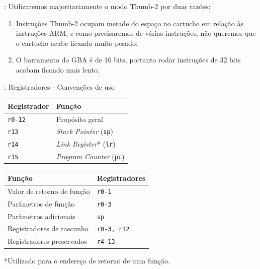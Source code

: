\documentclass{beamer}
\begin{document}
\begin{darkframes}
\begin{frame}{\secname: \subsecname}
    Utilizaremos majoritariamente o modo Thumb-2 por duas razões:
    \begin{enumerate}
        \item Instruções Thumb-2 ocupam metade do espaço no cartucho em
            relação às instruções ARM, e como precisaremos de várias
            instruções, não queremos que o cartucho acabe ficando muito
            pesado;
        \item O barramento do GBA é de 16 bits, portanto rodar instruções
            de 32 bits acabam ficando mais lento.
    \end{enumerate}
\end{frame}

\begin{frame}{\secname: Registradores - Convenções de uso}
    \begin{center}
        \begin{tabular}{|l|l|}
            \hline
            Registrador & Função \\\hline
            \texttt{r0-12} & Propósito geral \\
            \texttt{r13} & \textit{Stack Pointer} (\texttt{sp}) \\
            \texttt{r14} & \textit{Link Register}* (\texttt{lr}) \\
            \texttt{r15} & \textit{Program Counter} (\texttt{pc}) \\
            \hline
        \end{tabular}


        \begin{tabular}{|l|l|}
            \hline
            Função & Registradores \\\hline
            Valor de retorno de função & \texttt{r0-1} \\
            Parâmetros de função & \texttt{r0-3} \\
            Parâmetros adicionais & \texttt{sp} \\
            Registradores de rascunho & \texttt{r0-3, r12} \\
            Registradores preservados & \texttt{r4-13} \\
            \hline
        \end{tabular}
    \end{center}

    *Utilizado para o endereço de retorno de uma função.
\end{frame}


\end{darkframes}
\end{document}
